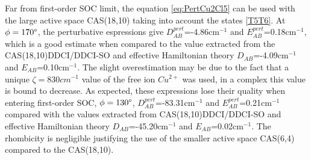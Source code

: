 \documentclass[12pt]{report}
\numberwithin{equation}{section}
\begin{document}
Far from first-order SOC limit, the equation \ref{eq:PertCu2Cl5} can be used with the large active space CAS(18,10) taking into account the states \ref{T5T6}.
At $\phi=170\degree$, the perturbative espressions give $D_{AB}^{pert}$=-4.86cm$^{-1}$ and $E_{AB}^{pert}$=0.18cm$^{-1}$, which is a good estimate when compared to the value extracted from the CAS(18,10)DDCI/DDCI-SO and effective Hamiltonian theory $D_{AB}$=-4.09cm$^{-1}$ and $E_{AB}$=0.10cm$^{-1}$.
The slight overestimation may be due to the fact that a unique $\zeta=830cm^{-1}$ value of the free ion $Cu^{2+}$ was used, in a complex this value is bound to decrease.
As expected, these expressions lose their quality when entering first-order SOC, $\phi=130\degree$, $D_{AB}^{pert}$=-83.31cm$^{-1}$ and $E_{AB}^{pert}$=0.21cm$^{-1}$ compared with the values extracted from CAS(18,10)DDCI/DDCI-SO and effective Hamiltonian theory $D_{AB}$=-45.20cm$^{-1}$ and $E_{AB}$=0.02cm$^{-1}$.
The rhombicity is negligible justifying the use of the smaller active space CAS(6,4) compared to the CAS(18,10).
\end{document}
